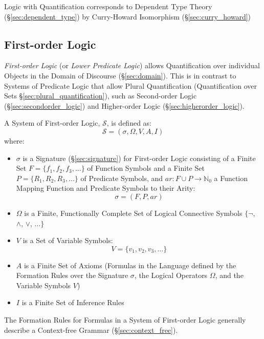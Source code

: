 Logic with Quantification corresponds to Dependent Type Theory
(\S\ref{sec:dependent_type}) by Curry-Howard Isomorphism
(\S\ref{sec:curry_howard})



\subsection{First-order Logic}\label{sec:firstorder_logic}

\emph{First-order Logic} (or \emph{Lower Predicate Logic}) allows
Quantification over individual Objects in the Domain of Discourse
(\S\ref{sec:domain}). This is in contrast to Systems of Predicate
Logic that allow Plural Quantification (Quantification over Sets
\S\ref{sec:plural_quantification}), such as Second-order Logic
(\S\ref{sec:secondorder_logic}) and Higher-order Logic
(\S\ref{sec:higherorder_logic}).

A System of First-order Logic, $\mathcal{S}$, is defined as:
\[
  \mathcal{S} = (\sigma,\Omega,V,A,I)
\]
where:
\begin{itemize}
  \item $\sigma$ is a Signature (\S\ref{sec:signature}) for
    First-order Logic consisting of a Finite Set $F = \{f_1, f_2, f_3,
    \ldots \}$ of Function Symbols and a Finite Set $P = \{ R_1, R_2,
    R_3, \ldots\}$ of Predicate Symbols, and $ar : F \cup P
    \rightarrow \mathbb{N}_0$ a Function Mapping Function and
    Predicate Symbols to their Arity:
    \[\sigma = (F,P,ar)\]
  \item $\Omega$ is a Finite, Functionally Complete Set of Logical
    Connective Symbols $\{\neg$, $\wedge$, $\vee$, $\ldots\}$
  \item $V$ is a Set of Variable Symbols:
    \[V = \{v_1, v_2, v_3, \ldots\}\]
  \item $A$ is a Finite Set of Axioms (Formulas in the Language
    defined by the Formation Rules over the Signature $\sigma$, the
    Logical Operators $\Omega$, and the Variable Symbols $V$)
  \item $I$ is a Finite Set of Inference Rules
\end{itemize}

The Formation Rules for Formulas in a System of First-order Logic
generally describe a Context-free Grammar (\S\ref{sec:context_free}).

